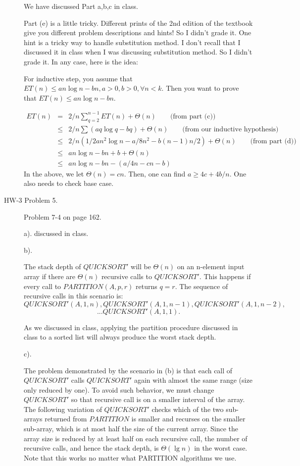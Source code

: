 \documentclass[11pt]{article}
\begin{document}
\begin{description}
We have discussed Part a,b,c in class.

Part (e) is a little tricky. Different prints of the 2nd edition
of the textbook give you different problem descriptions and hints!
So I didn't grade it. One hint is a tricky way to handle
substitution method. I don't recall that I discussed it in class
when I was discussing substitution method. So I didn't grade it.
In any case, here is the idea:

For inductive step, you assume that $ET(n)\le an\log n - bn, a>0,
b>0, \forall n<k$. Then you want to prove that $ET(n)\le an\log n
- bn$.

\begin{eqnarray}
ET(n) &=& 2/n \sum_{q=2}^{n-1} ET(n) + \Theta(n) \qquad \mbox{(from part (c))}\\
&\le& 2/n \sum (aq\log q - bq) + \Theta(n)  \qquad\mbox{(from our inductive hypothesis)}\\
&\le& 2/n (1/2 an^2\log n - a/8 n^2 - b(n-1)n/2) + \Theta(n) \qquad\mbox{(from part (d))}\\
&\le& an\log n - bn + b + \Theta(n)\\
&\le& an\log n - bn - (a/4 n - cn - b)
\end{eqnarray}
In the above, we let $\Theta(n)=cn$. Then, one can find $a\ge 4 c
+ 4b/n$. One also needs to check base case.








\item[HW-3 Problem 5.] Problem 7-4 on page 162.

a). discussed in class.

b).

The stack depth of $QUICKSORT'$ will be $\Theta(n)$ on an n-element input array if there are
$\Theta(n)$ recursive calls to $QUICKSORT'$. This happens if every call to $PARTITION(A,p,r)$
returns $q=r$. The sequence of recursive calls in this scenario is:
$$
QUICKSORT' (A,1,n), QUICKSORT' (A,1,n-1), QUICKSORT' (A,1,n-2),
$$
$$
 ... QUICKSORT' (A,1,1).
$$

As we discussed in class, applying the partition procedure
discussed in class to a sorted list will always produce the worst
stack depth.

 c).

The problem demonstrated by the scenario in (b) is that each call
of $QUICKSORT'$ calls $QUICKSORT'$ again with almost the same
range (size only reduced by one). To avoid such behavior, we must
change $QUICKSORT'$ so that recursive call is on a smaller
interval of the array. The following variation of $QUICKSORT'$
checks which of the two sub-arrays returned from $PARTITION$ is
smaller and recurses on the smaller sub-array, which is at most
half the size of the current array. Since the array size is
reduced by at least half on each recursive call, the number of
recursive calls, and hence the stack depth, is $\Theta(\lg n)$ in
the worst case. Note that this works no matter what PARTITION
algorithms we use.


\end{description}
\end{document}
